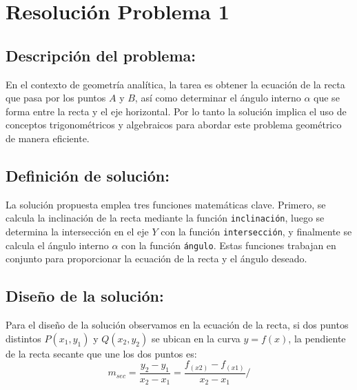 \section{Resolución Problema 1} 

\subsection{\textbf{Descripción del problema:}}
En el contexto de geometría analítica, la tarea es obtener la ecuación de la recta que pasa por los puntos $A$ y $B$, así como determinar el ángulo interno $\alpha$ que se forma entre la recta y el eje horizontal. Por lo tanto la solución implica el uso de conceptos trigonométricos y algebraicos para abordar este problema geométrico de manera eficiente.

\subsection{\textbf{Definición de solución:}}
La solución propuesta emplea tres funciones matemáticas clave. Primero, se calcula la inclinación de la recta mediante la función \texttt{inclinación}, luego se determina la intersección en el eje $Y$ con la función \texttt{intersección}, y finalmente se calcula el ángulo interno $\alpha$ con la función \texttt{ángulo}. Estas funciones trabajan en conjunto para proporcionar la ecuación de la recta y el ángulo deseado.

\subsection{\textbf{Diseño de la solución:}}
Para el diseño de la solución observamos en la ecuación de la recta, si dos puntos distintos $P(x_{1}, y_{1})$ y $Q(x_{2}, y_{2})$ se ubican en la curva $y=f(x)$, la pendiente de la recta secante que une los dos puntos es:
\begin{equation}
    m_{sec}=\frac{y_{2} - y_{1}}{x_{2} - x_{1}} = \frac{f_{(x2)} - f_{(x1)} }{x_{2} - x_{1}}/
    \label{eqn:rectaPendiente}
\end{equation}

